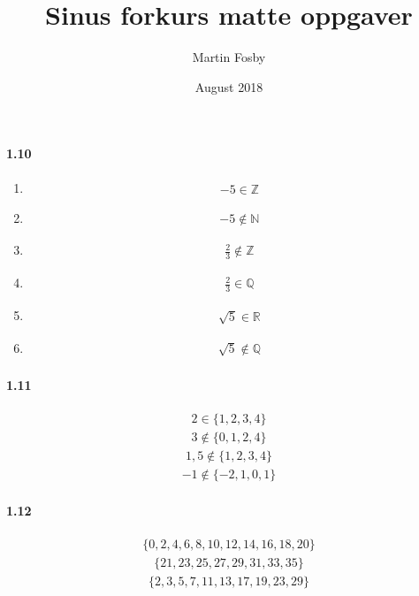 \documentclass{article}
\title{Sinus forkurs matte oppgaver}
\author{Martin Fosby}
\date{August 2018}
\newcommand{\Z}{\mathbb{Z}}
\newcommand{\N}{\mathbb{N}}
\newcommand{\Q}{\mathbb{Q}}
\newcommand{\R}{\mathbb{R}}
\newcommand\litem[1]{\item{\bfseries#1\space}}
\begin{document}
\maketitle
{}

\section{}
\paragraph{1.10}
\begin{enumerate}[label=\emph{\alph*})]
\litem{
  \begin{align*}
    -5 \in \Z
  \end{align*}
  }
\litem{
  \begin{align*}
   -5 \notin \N
  \end{align*}
  }
\litem{
\begin{align*}
   \frac{2}{3} \notin \Z
\end{align*}
}
\litem{
\begin{align*}
  \frac{2}{3} \in \Q
\end{align*}
}
\litem{
\begin{align*}
  \sqrt{5} \in \R
\end{align*}
}
\litem{
\begin{align*}
  \sqrt{5} \notin \Q
\end{align*}
}
\end{enumerate}

\paragraph{1.11}
\begin{align*}
  2 \in \{1,2,3,4\}
\end{align*}
\begin{align*}
  3 \notin \{0,1,2,4\}
\end{align*}
\begin{align*}
  1,5 \notin \{1,2,3,4\}
\end{align*}
\begin{align*}
  -1 \notin \{-2,1,0,1\}
\end{align*}

\paragraph{1.12}
\begin{align*}
  \{0,2,4,6,8,10,12,14,16,18,20\}
\end{align*}
\begin{align*}
  \{21,23,25,27,29,31,33,35\}
\end{align*}
\begin{align*}
  \{2,3,5,7,11,13,17,19,23,29\}
\end{align*}
\end{document}
